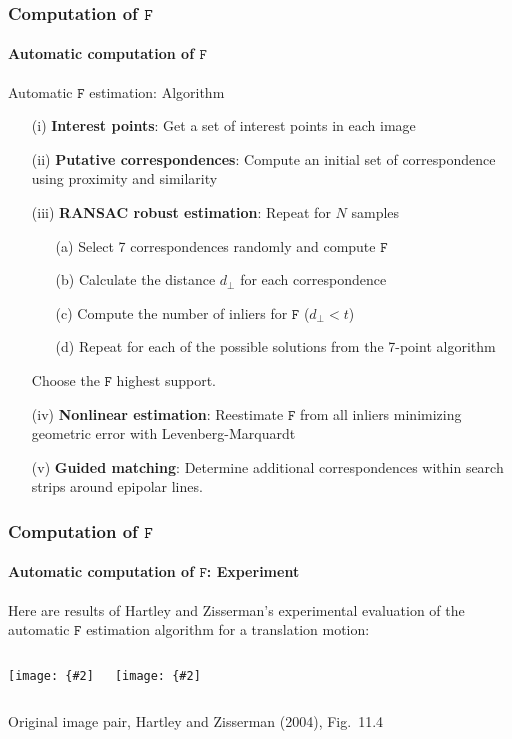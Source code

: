 \documentclass[aspectratio=169]{beamer}
\newcommand{\mat}[1]{\mathtt{#1}}
\newcommand{\myfig}[3]{\centerline{\texttt{[image: \{\#2]}}}
    \centerline{\scriptsize #3}}
\begin{document}
\begin{frame}
\frametitle{Computation of $\mat{F}$}
\framesubtitle{Automatic computation of $\mat{F}$}

\begin{block}{Automatic $\mat{F}$ estimation: Algorithm}
\begin{itemize}
\item[(i)] {\bf Interest points}: Get a set of interest points in each image
\item[(ii)] {\bf Putative correspondences}: Compute an initial set of
correspondence using proximity and similarity
\item[(iii)] {\bf RANSAC robust estimation}: Repeat for $N$ samples
  \begin{itemize}
  \item[(a)] Select 7 correspondences randomly and compute $\mat{F}$
  \item[(b)] Calculate the distance $d_{\perp}$ for each correspondence
  \item[(c)] Compute the number of inliers for $\mat{F}$ ($d_{\perp}<t$)
  \item[(d)] Repeat for each of the possible solutions from the
  7-point algorithm
  \end{itemize}
  Choose the $\mat{F}$ highest support.
\item[(iv)] {\bf Nonlinear estimation}: Reestimate $\mat{F}$ from all
inliers minimizing geometric error with Levenberg-Marquardt
\item[(v)] {\bf Guided matching}: Determine additional correspondences
within search strips around epipolar lines.
\end{itemize}
\end{block}

\end{frame}

\begin{frame}
\frametitle{Computation of $\mat{F}$}
\framesubtitle{Automatic computation of $\mat{F}$: Experiment}

Here are results of Hartley and Zisserman's experimental evaluation of
the automatic $\mat{F}$ estimation algorithm for a translation motion:

\medskip

\begin{columns}
\column{2.25in}
\myfig{2.2in}{HZ-fig10-4a}{}
\column{2.25in}
\myfig{2.2in}{HZ-fig10-4b}{}
\end{columns}

\centerline{\scriptsize Original image pair, Hartley and Zisserman
(2004), Fig.\ 11.4}

\end{frame}
\end{document}
